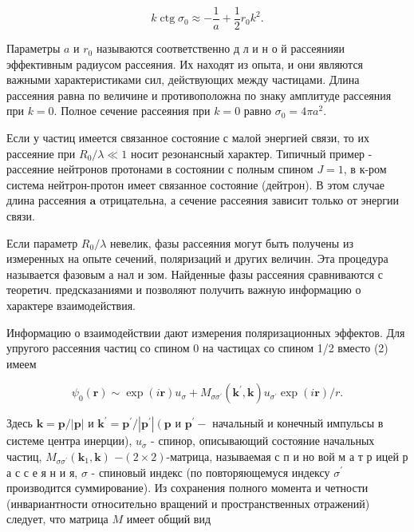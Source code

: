 \documentclass[10pt]{article}
\begin{document}
\[

k \operatorname{ctg} \sigma_{0} \approx-\frac{1}{a}+\frac{1}{2} r_{0} k^{2} .

\]



Параметры $a$ и $r_{0}$ называются соответственно д л и н о й рассеянияи эффективным радиусом рассеяния. Их находят из опыта, и они являются важными характеристиками сил, действующих между частицами. Длина рассеяния равна по величине и противоположна по знаку амплитуде рассеяния при $k=0$. Полное сечение рассеяния при $k=0$ равно $\sigma_{0}=4 \pi a^{2}$.



Если у частиц имеется связанное состояние с малой энергией связи, то их рассеяние при $R_{0} / \lambda \ll 1$ носит резонансный характер. Типичный пример - рассеяние нейтронов протонами в состоянии с полным спином $J=1$, в к-ром система нейтрон-протон имеет связанное состояние (дейтрон). В этом случае длина рассеяния $\boldsymbol{a}$ отрицательна, а сечение рассеяния зависит только от энергии связи.



Если параметр $R_{0} / \lambda$ невелик, фазы рассеяния могут быть получены из измеренных на опыте сечений, поляризаций и других величин. Эта процедура называется фазовым а нал и зом. Найденные фазы рассеяния сравниваются с теоретич. предсказаниями и позволяют получить важную информацию о характере взаимодействия.



Информацию о взаимодействии дают измерения поляризационных эффектов. Для упругого рассеяния частиц со спином 0 на частицах со спином 1/2 вместо (2) имеем



\[

\psi_{0}(\boldsymbol{r}) \sim \exp (i \boldsymbol{r}) u_{\sigma}+M_{\sigma \sigma^{\prime}}\left(\boldsymbol{k}^{\prime}, \boldsymbol{k}\right) u_{\sigma^{\prime}} \exp (i \boldsymbol{r}) / r .

\]



Здесь $\boldsymbol{k}=\boldsymbol{p} /|\boldsymbol{p}|$ и $\boldsymbol{k}^{\prime}=\boldsymbol{p}^{\prime} /\left|\boldsymbol{p}^{\prime}\right|\left(\boldsymbol{p}\right.$ и $\boldsymbol{p}^{\prime}-$ начальный и конечный импульсы в системе центра инерции), $u_{\sigma}$ - спинор, описывающий состояние начальных частиц, $M_{\sigma \sigma^{\prime}}\left(\boldsymbol{k}_{1}, \boldsymbol{k}\right)$ $-(2 \times 2)$-матрица, называемая с п и но вой м а т р ицей р а с с е я н и я, $\sigma$ - спиновый индекс (по повторяющемуся индексу $\sigma^{\prime}$ производится суммирование). Из сохранения полного момента и четности (инвариантности относительно вращений и пространственных отражений) следует, что матрица $M$ имеет общий вид
\end{document}
